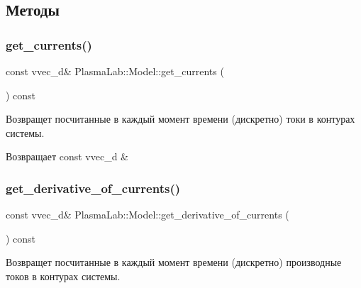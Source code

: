 \subsection{Методы}
\mbox{\label{class_plasma_lab_1_1_model_a4b116ad25a3cf812d21889f1894e3a79}} 
\subsubsection{\texorpdfstring{get\+\_\+currents()}{get\_currents()}}
{\footnotesize\ttfamily const vvec\+\_\+d\& Plasma\+Lab\+::\+Model\+::get\+\_\+currents (\begin{DoxyParamCaption}{ }\end{DoxyParamCaption}) const\hspace{0.3cm}{\ttfamily [inline]}}



Возвращет посчитанные в каждый момент времени (дискретно) токи в контурах системы. 

\begin{DoxyReturn}{Возвращает}
const vvec\+\_\+d \& 
\end{DoxyReturn}
\mbox{\label{class_plasma_lab_1_1_model_a83e3fa03423a4a56eb9754a6c097d851}} 
\subsubsection{\texorpdfstring{get\+\_\+derivative\+\_\+of\+\_\+currents()}{get\_derivative\_of\_currents()}}
{\footnotesize\ttfamily const vvec\+\_\+d\& Plasma\+Lab\+::\+Model\+::get\+\_\+derivative\+\_\+of\+\_\+currents (\begin{DoxyParamCaption}{ }\end{DoxyParamCaption}) const\hspace{0.3cm}{\ttfamily [inline]}}



Возвращет посчитанные в каждый момент времени (дискретно) производные токов в контурах системы. 

